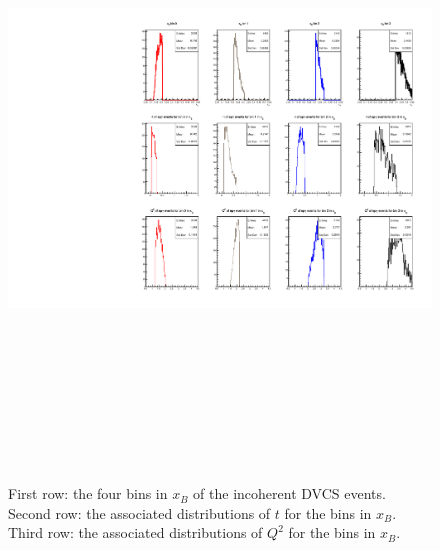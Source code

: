 \begin{figure}[h!]
   \centering
   \includegraphics[height=17.0cm]{4D-incoh-bin/4D-xB_InCoh_bins.pdf}
   \caption{ First row: the four bins in $x_B$ of the incoherent DVCS events.  
   Second row: the associated distributions of $t$ for the bins in $x_B$.    
   Third row: the associated distributions of $Q^2$ for the bins in $x_B$.}
\label{fig:incoh_xB-bins-freep}
\end{figure}


